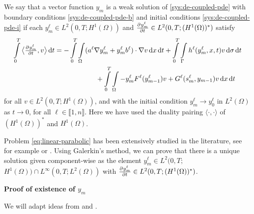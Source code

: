 \documentclass[11pt]{article}
\newcommand{\llb}{\llbracket}
\newcommand{\rrb}{\rrbracket}
\numberwithin{equation}{section}
\begin{document}
We say that a vector function \(y_m\) is a weak solution of \eqref{sys:de-coupled-pde} with boundary conditions \eqref{sys:de-coupled-pde-b} and initial conditions \eqref{sys:de-coupled-pde-i} if each \(y^\ell_m \in L^2(0,T;H^1(\Omega)) \) and \( \pd{y_m^\ell}{t} \in L^2(0,T;(H^1(\Omega))^*) \)  satisfy
\begin{equation}
\label{eq:linear-parabolic}
\begin{aligned}
	\int\limits_0^T %
	    \big\langle \pd{ y_m^\ell}{t}, v \big\rangle
	\dif t
	&=
	-
	\int\limits_0^T 
	\int\limits_\Omega (a^\ell \nabla y_m^\ell + y_m^\ell b^\ell ) \cdot \nabla v \dif x \dif t
	+
	\int\limits_0^T 
	\int\limits_\Gamma h^\ell (y_{m}^\ell,x,t) v \dif \sigma\dif t 
	\\ &\qquad\qquad\qquad
	+
	\int\limits_0^T \int\limits_\Omega 
	-y_m^\ell F^\ell(y^\ell_{m-1}) v + G^\ell(s_m^\ell, y_{m-1}) v \dif x \dif t
\end{aligned}
\end{equation}
for all \( v \in L^2 (0,T;H^1(\Omega) ) \), and with the initial condition \( y_m^\ell \to y_0^\ell \) in \(L^2(\Omega)\) as \( t\to 0\), for all \(\ell \in \llb 1,n\rrb\). 
Here we have used the duality pairing \(\langle \cdot, \cdot \rangle\) of \( (H^1(\Omega))^*\) and \( H^1(\Omega)\).
	
Problem \eqref{eq:linear-parabolic} has been extensively studied in the literature, see for example \cite{Ladyzenskaja-1968} or \cite{Pao-1993}. Using Galerkin's method, we can prove that there is a unique solution given component-wise as the element \(y_m^\ell \in L^2(0,T;\)  \( H^1(\Omega)) \cap L^\infty(0,T; L^2(\Omega))\) with \( \pd{y_m^\ell}{t} \in L^2(0,T; (H^1(\Omega))^*) \).



\vspace{1\baselineskip}
\noindent\textbf{Proof of existence of \(y_m\)}
\vspace{0.5\baselineskip}
	
	We will adapt ideas from \cite{Ladyzenskaja-1968,Troltzsch-2010} and \cite{Evans-2010}.
	
\end{document}
